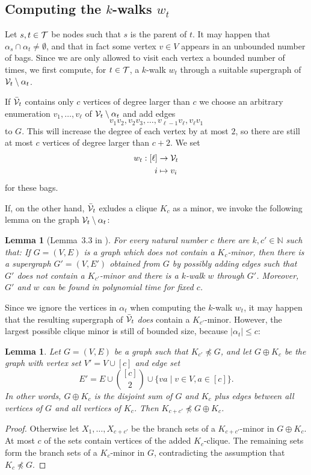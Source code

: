 \documentclass[12pt]{amsart}
\newtheorem{lemma}[theorem]{Lemma}
\newcommand{\suchthat}{\mathbin |}
\newcommand{\absval}[1]{\left\vert #1 \right\vert}
\newcommand{\N}{\mathds{N}}
\begin{document}
\subsection{Computing the $k$-walks $w_t$}

Let $s,t \in \mathcal{T}$ be nodes such that $s$ is the parent of $t$. It may
happen that $\alpha_s \cap \alpha_t \not = \emptyset$, and that in fact
some vertex $v \in V$ appears in an unbounded number of bags. Since we
are only allowed to visit each vertex a bounded number of times, we
first compute, for $t \in \mathcal{T}$, a $k$-walk $w_t$ through a suitable
supergraph of $\mathcal{V}_t \setminus \alpha_t$.

If ${\bar{\mathcal{V}}}_t$ contains only $c$ vertices of degree larger than $c$
we choose an arbitrary enumeration $v_1,\ldots,v_{\ell}$ of
$\mathcal{V}_t\setminus \alpha_t$ and add edges
\[
v_1v_2, v_2v_3, \ldots,v_{\ell-1}v_\ell,v_{\ell}v_1
\]
to $G$. This will increase the degree of each vertex by at most $2$,
so there are still at most $c$ vertices of degree larger than
$c+2$. We set
\[\begin{split}
w_t : [\ell] &\to \mathcal{V}_t
\\
i &\mapsto v_i
\end{split}
\]
for these bags.

If, on the other hand, ${\bar{\mathcal{V}}}_t$ exludes a clique $K_c$ as
a minor, we invoke the following lemma on the graph $\mathcal{V}_t \setminus
\alpha_t$:
\begin{lemma}[Lemma~3.3 in \cite{ekk13}]
  \label{lem:kwalkexcl}
  For every natural number $c$ there are $k,c'\in\N$ such that: If $G
  = (V,E)$ is a graph which does not contain a $K_c$-minor, then there
  is a supergraph $G' = (V,E')$ obtained from $G$ by possibly adding
  edges such that $G'$ does not contain a $K_{c'}$-minor and there is a
  $k$-walk $w$ through $G'$. Moreover, $G'$ and $w$ can be found in
  polynomial time for fixed $c$.
\end{lemma}
Since we ignore the vertices in $\alpha_t$ when computing the
$k$-walk $w_t$, it may happen that the resulting supergraph of
${\bar{\mathcal{V}}}_t$ \emph{does} contain a $K_{c'}$-minor. However, the largest
possible clique minor is still of bounded size, because
$\absval{\alpha_t} \leq c$:
\begin{lemma}
  Let $G = (V,E)$ be a graph such that $K_{c'} \not\preceq G$, and let $G
  \oplus K_c$ be the graph with vertex set $V' = V \cup [c]$ and edge
  set
  \[
  E' = E \cup \binom{[c]}{2} \cup \{ va \suchthat v \in V, a \in [c] \}.
  \]
  In other words, $G \oplus K_c$ is the disjoint sum of $G$ and $K_c$
  plus edges between all vertices of $G$ and all vertices of
  $K_c$. Then $K_{c+c'} \not\preceq G \oplus K_c$.
\end{lemma}
\begin{proof}
  Otherwise let $X_1,\ldots,X_{c+c'}$ be the branch sets of a
  $K_{c+c'}$-minor in $G \oplus K_c$. At most $c$ of the sets contain
  vertices of the added $K_c$-clique. The remaining sets form the
  branch sets of a $K_c$-minor in $G$, contradicting the assumption
  that $K_c \not\preceq G$.
\end{proof}
\end{document}
